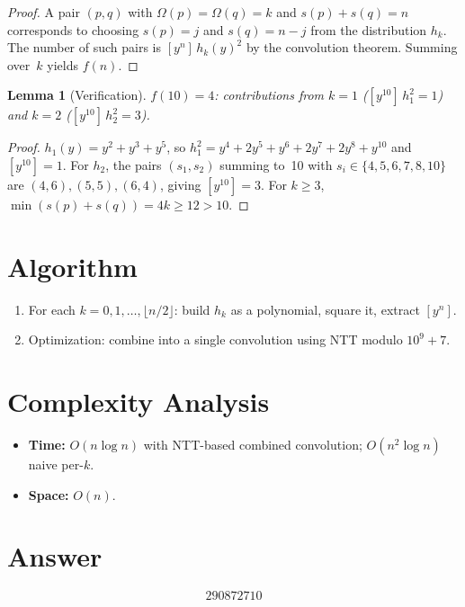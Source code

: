 \documentclass[11pt]{article}
\newtheorem{lemma}[theorem]{Lemma}
\begin{document}
\begin{proof}
A pair $(p,q)$ with $\Omega(p)=\Omega(q)=k$ and $s(p)+s(q)=n$ corresponds to choosing $s(p)=j$ and $s(q)=n-j$ from the distribution $h_k$. The number of such pairs is $[y^n]\,h_k(y)^2$ by the convolution theorem. Summing over~$k$ yields $f(n)$.
\end{proof}

\begin{lemma}[Verification]
$f(10) = 4$: contributions from $k=1$ ($[y^{10}]\,h_1^2=1$) and $k=2$ ($[y^{10}]\,h_2^2=3$).
\end{lemma}

\begin{proof}
$h_1(y) = y^2+y^3+y^5$, so $h_1^2 = y^4+2y^5+y^6+2y^7+2y^8+y^{10}$ and $[y^{10}]=1$. For $h_2$, the pairs $(s_1,s_2)$ summing to~10 with $s_i \in \{4,5,6,7,8,10\}$ are $(4,6),(5,5),(6,4)$, giving $[y^{10}]=3$. For $k\ge 3$, $\min(s(p)+s(q))=4k\ge 12>10$.
\end{proof}

\section{Algorithm}

\begin{enumerate}
  \item For each $k = 0,1,\ldots,\lfloor n/2\rfloor$: build $h_k$ as a polynomial, square it, extract $[y^n]$.
  \item Optimization: combine into a single convolution using NTT modulo $10^9+7$.
\end{enumerate}

\section{Complexity Analysis}

\begin{itemize}
  \item \textbf{Time:} $O(n\log n)$ with NTT-based combined convolution; $O(n^2\log n)$ naive per-$k$.
  \item \textbf{Space:} $O(n)$.
\end{itemize}

\section{Answer}

\[
\boxed{290872710}
\]
\end{document}
